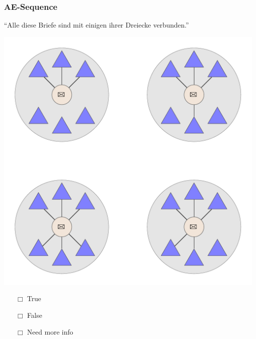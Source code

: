 \documentclass[fleqn,10pt,serif,xcolor=dvipsnames]{beamer}
\renewcommand{\AE}{AE\xspace}
\newcommand{\mymark}[1]{{\color{blue}{#1}}}
\begin{document}
\begin{frame}
  \frametitle{\AE-Sequence}
  \begin{center}
    ``Alle diese Briefe sind mit einigen ihrer Dreiecke verbunden.''

    \vspace{0.1cm}

    \includegraphics[width=0.5 \textwidth]{../../pictures/ae_01_7.pdf}

    \vspace{0.1cm}

    \begin{multicols}{3}
      \begin{itemize} 
      \item[$\Box$] True\\
        \onslide<2>{$\leadsto$  \mymark{false}}
      \item[$\Box$] False\\
        \onslide<2>{$\leadsto$ \mymark{local}}
      \item[$\Box$] Need more info 
      \end{itemize}
    \end{multicols}

  \end{center}
\end{frame}
\end{document}
